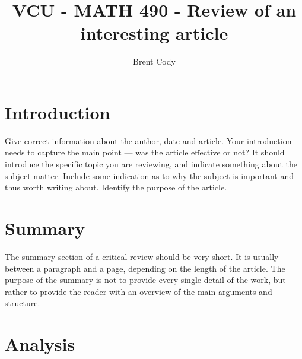 \documentclass{article}
\begin{document}
\title{VCU - MATH 490 - Review of an interesting article}

\author{Brent Cody}

\maketitle              %








\section{Introduction}

Give correct information about the author, date and article. Your introduction needs to capture the main point --- was the article effective or not? It should introduce the specific topic you are reviewing, and indicate something about the subject matter. Include some indication as to why the subject is important and thus worth writing about. Identify the purpose of the article.

\section{Summary}


The summary section of a critical review should be very short. It is usually between a paragraph and a page, depending on the length of the article. The purpose of the summary is not to provide every single detail of the work, but rather to provide the reader with an overview of the main arguments and structure.

\section{Analysis}
\end{document}

